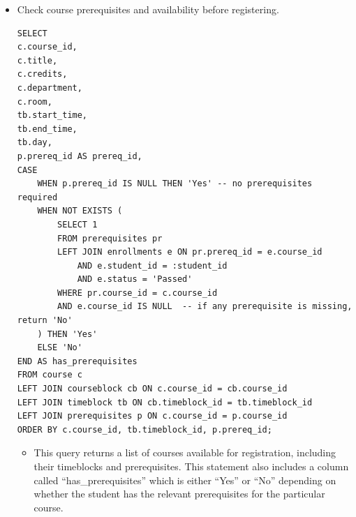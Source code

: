 \documentclass{report}
\begin{document}
\begin{itemize}
    \item Check course prerequisites and availability before registering.
    \begin{lstlisting}
SELECT
c.course_id,
c.title,
c.credits,
c.department,
c.room,
tb.start_time,
tb.end_time,
tb.day,
p.prereq_id AS prereq_id,
CASE
    WHEN p.prereq_id IS NULL THEN 'Yes' -- no prerequisites required
    WHEN NOT EXISTS (
        SELECT 1
        FROM prerequisites pr
        LEFT JOIN enrollments e ON pr.prereq_id = e.course_id
            AND e.student_id = :student_id
            AND e.status = 'Passed'
        WHERE pr.course_id = c.course_id
        AND e.course_id IS NULL  -- if any prerequisite is missing, return 'No'
    ) THEN 'Yes'
    ELSE 'No'
END AS has_prerequisites
FROM course c
LEFT JOIN courseblock cb ON c.course_id = cb.course_id
LEFT JOIN timeblock tb ON cb.timeblock_id = tb.timeblock_id
LEFT JOIN prerequisites p ON c.course_id = p.course_id
ORDER BY c.course_id, tb.timeblock_id, p.prereq_id;
    \end{lstlisting}
    \begin{itemize}
        \item This query returns a list of courses available for registration, including their timeblocks and prerequisites. This statement also includes a column called ``has\_prerequisites'' which is either ``Yes'' or ``No'' depending on whether the student has the relevant prerequisites for the particular course.
    \end{itemize}


\end{itemize}
\end{document}
